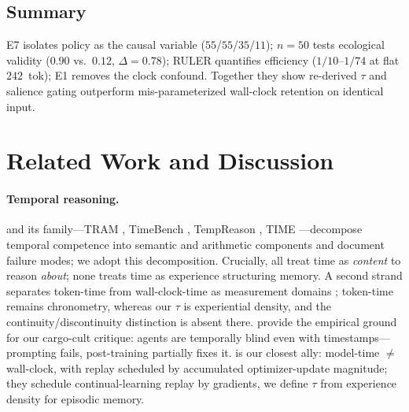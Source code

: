 \documentclass[letterpaper]{article}
\begin{document}
\subsection{Summary}
E7 isolates policy as the causal variable ($55$/$55$/$35$/$11$); $n{=}50$ tests ecological validity ($0.90$ vs.\ $0.12$, $\Delta{=}0.78$); RULER quantifies efficiency ($1/10$--$1/74$ at flat $242$~tok); E1 removes the clock confound. Together they show re-derived $\tau$ and salience gating outperform mis-parameterized wall-clock retention on identical input.

\section{Related Work and Discussion}\label{sec:rel}
\paragraph{Temporal reasoning.} \citet{fatemi2025tot} and its family---TRAM \citep{tram2024}, TimeBench \citep{chu2024timebench}, TempReason \citep{tan2023tempreason}, TIME \citep{yuan2025time}---decompose temporal competence into semantic and arithmetic components and document failure modes; we adopt this decomposition. Crucially, all treat time as \emph{content} to reason \emph{about}; none treats time as experience structuring memory. A second strand separates token-time from wall-clock-time as measurement domains \citep{discrete2025continuous,cacm2026time}; token-time remains chronometry, whereas our $\tau$ is experiential density, and the continuity/discontinuity distinction is absent there. \citet{cheng2026blind} provide the empirical ground for our cargo-cult critique: agents are temporally blind even with timestamps---prompting fails, post-training partially fixes it. \citet{forever2026} is our closest ally: model-time $\neq$ wall-clock, with replay scheduled by accumulated optimizer-update magnitude; they schedule continual-learning replay by gradients, we define $\tau$ from experience density for episodic memory.
\end{document}

